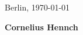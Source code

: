 \documentclass[11pt, a4paper, roman]{moderncv}        %
\begin{document}

Berlin, \today\vspace*{3em}

\textbf{Cornelius Hennch}


\clearpage

\end{document}
